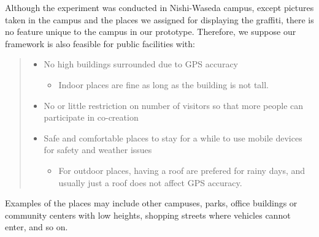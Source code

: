 Although the experiment was conducted in Nishi-Waseda campus, except pictures taken in the campus and the places we assigned for displaying the graffiti,
there is no feature unique to the campus in our prototype.
Therefore, we suppose our framework is also feasible for public facilities with:
\begin{quote}
  \begin{itemize}
    \item No high buildings surrounded due to GPS accuracy
      \begin{itemize}
        \item Indoor places are fine as long as the building is not tall.
      \end{itemize}
    \item No or little restriction on number of visitors so that more people can participate in co-creation
    \item Safe and comfortable places to stay for a while to use mobile devices for safety and weather issues
      \begin{itemize}
        \item For outdoor places, having a roof are prefered for rainy days, and usually just a roof does not affect GPS accuracy.
      \end{itemize}
  \end{itemize}
\end{quote}

Examples of the places may include other campuses, parks, office buildings or community centers with low heights, shopping streets where vehicles cannot enter, and so on.